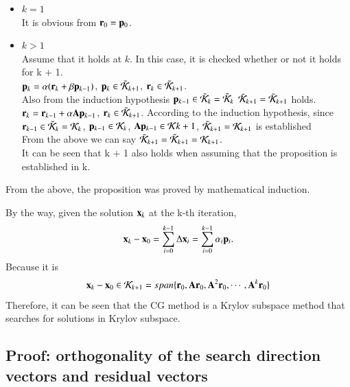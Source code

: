 \begin {itemize}
\item \textbf{$k=1$} \\
It is obvious from $\mathbf{r}_0=\mathbf{p}_0$.

\item \textbf{$k>1$} \\
Assume that it holds at $k$. In this case, it is checked whether or not it holds for k + 1. \\
$\mathbf{p}_k=\alpha(\mathbf{r}_k+\beta\mathbf{p}_{k-1})$, $\mathbf{p}_k\in\bar{\cal K}_{k+1}$, $\mathbf{r}_k\in\tilde{\cal K}_{k+1}$. \\
Also from the induction hypothesis $\mathbf{p}_{k-1}\in\bar{\cal K}_k=\tilde{\cal K}_k$ $\bar{\cal K}_{k+1}=\tilde{\cal K}_{k+1}$ holds. \\
$\mathbf{r}_k=\mathbf{r}_{k-1}+\alpha\mathbf{A}\mathbf{p}_{k-1}$, $\mathbf{r}_k\in\tilde{\cal K}_{k+1}$.
According to the induction hypothesis, since $\mathbf{r}_{k-1}\in\tilde{\cal K}_k={\cal K}_k$, $\mathbf{p}_{k-1}\in{\cal K}_k$, $\mathbf{A}\mathbf{p}_{k-1}\in{\cal K}{k+1}$, $\tilde{\cal K}_{k+1}={\cal K}_{k+1}$ is established \\
From the above we can say $\bar{\cal K}_{k+1}=\tilde{\cal K}_{k+1}={\cal K}_{k+1}$. \\
It can be seen that k + 1 also holds when assuming that the proposition is established in k.
\end{itemize}

From the above, the proposition was proved by mathematical induction.




By the way, given the solution $\mathbf{x}_k$ at the k-th iteration,
%
\begin{equation}
\mathbf{x}_k-\mathbf{x}_0=\sum_{i=0}^{k-1}\Delta\mathbf{x}_i=\sum_{i=0}^{k-1}\alpha_i\mathbf{p}_i.
\end{equation}
%
Because it is
%
\begin{equation}
\mathbf{x}_k-\mathbf{x}_0\in\mathbf{\cal K}_{k+1}=span\{\mathbf{r}_0,\mathbf{A}\mathbf{r}_0,\mathbf{A}^2\mathbf{r}_0,\cdots,\mathbf{A}^k\mathbf{r}_0\}
\end{equation}
%
Therefore, it can be seen that the CG method is a Krylov subspace method that searches for solutions in Krylov subspace. 





\subsection{Proof: orthogonality of the search direction vectors and residual vectors}

